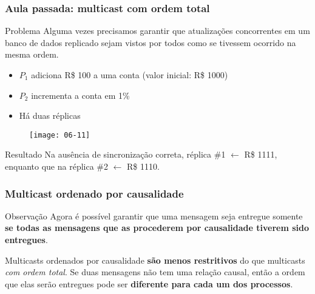 \documentclass[Ligatures=TeX,table,brazil,svgnames,usetotalslideindicator,compress,10pt]{beamer}
\begin{document}
\begin{frame}
  \frametitle{Aula passada: multicast com ordem total}
  \begin{alertblock}{Problema}
    Alguma vezes precisamos garantir que atualizações concorrentes em um banco de dados replicado sejam vistos por todos como se tivessem ocorrido na mesma ordem.

  \begin{itemize}
  \item $P_1$ adiciona R\$ 100 a uma conta (valor inicial: R\$ 1000)
  \item $P_2$ incrementa a conta em 1\%
  \item Há duas réplicas
  \end{itemize}
\end{alertblock}

\begin{figure}
  \centering
  \texttt{[image: 06-11]}
\end{figure}

\vspace{-1ex}
\begin{block}{Resultado}
  Na ausência de sincronização correta, \newline réplica \#1 $\leftarrow$ R\$ 1111, enquanto que na réplica \#2 $\leftarrow$ R\$ 1110.
\end{block}

\end{frame}


\begin{frame}
  \frametitle{Multicast ordenado por causalidade}
  \begin{block}{Observação}
    Agora é possível garantir que uma mensagem seja entregue somente
    \textbf{se todas as mensagens que as procederem por causalidade tiverem
    sido entregues}.

    Multicasts \alert{ordenados por causalidade} \textbf{são menos restritivos}
    do que multicasts \emph{com ordem total}. Se
    duas mensagens não tem uma relação causal, então a ordem que elas serão
    entregues pode ser \textbf{diferente para cada um dos processos}.
  \end{block}
\end{frame}
\end{document}
